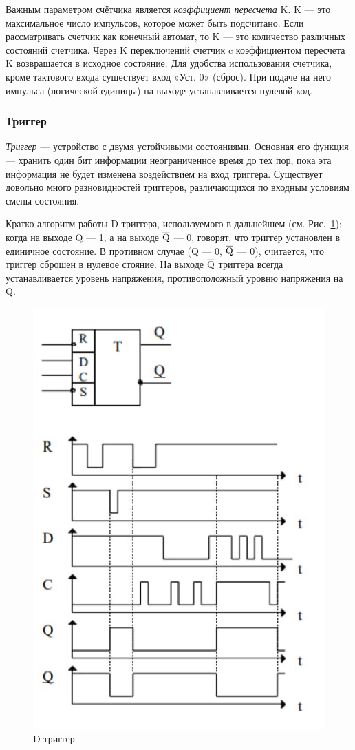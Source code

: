 \documentclass[a4paper, final]{article}
\begin{document}
Важным параметром счётчика является \textit{коэффициент пересчета} K. K --- это максимальное число импульсов, которое может быть подсчитано. Если рассматривать счетчик как конечный автомат, то K --- это количество различных состояний счетчика. Через K переключений счетчик c коэффициентом пересчета K возвращается в исходное состояние. Для удобства использования счетчика, кроме тактового входа существует вход «Уст. 0» (сброс). При подаче на него импульса (логической единицы) на выходе устанавливается нулевой код. 

\subsubsection{Триггер}
\textit{Триггер} --- устройство с двумя устойчивыми состояниями. Основная его функция --- хранить один бит информации неограниченное время до тех пор, пока эта информация не будет изменена воздействием на вход триггера. Существует довольно много разновидностей триггеров, различающихся по входным условиям смены состояния.

Кратко алгоритм работы D-триггера, используемого в дальнейшем (см. Рис.~\ref{img:trigger}): когда на выходе Q --- 1‚ а на выходе $\overline{\rm Q}$ --- 0, говорят, что триггер установлен в единичное состояние. В противном случае (Q --- 0, $\overline{\rm Q}$ --- 0), считается, что триггер сброшен в нулевое стояние. На выходе $\overline{\rm Q}$ триггера всегда устанавливается уровень напряжения, противоположный уровню напряжения на Q.

\begin{figure}[H]
   \centering
   \includegraphics[scale=0.6]{trigger.png}
   \caption{D-триггер}
   \label{img:trigger}
\end{figure}
\end{document}
